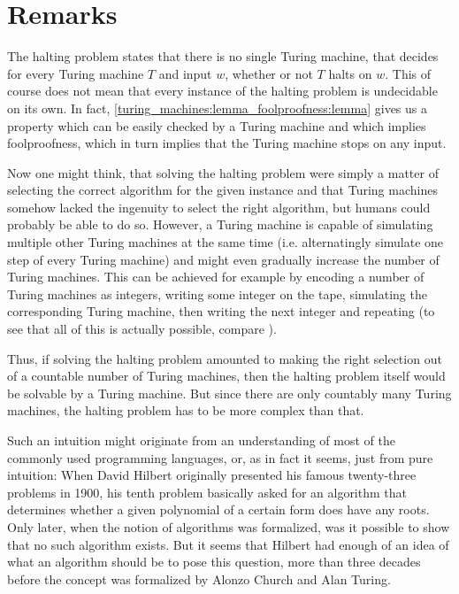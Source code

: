 \section{Remarks}

\begin{Remark}
	The halting problem states that there is no single Turing machine, that decides for every Turing machine $T$ and input $w$, whether or not $T$ halts on $w$. This of course does not mean that every instance of the halting problem is undecidable on its own. In fact, \ref{turing_machines:lemma_foolproofness:lemma} gives us a property which can be easily checked by a Turing machine and which implies foolproofness, which in turn implies that the Turing machine stops on any input.

	Now one might think, that solving the halting problem were simply a matter of selecting the correct algorithm for the given instance and that Turing machines somehow lacked the ingenuity to select the right algorithm, but humans could probably be able to do so. However, a Turing machine is capable of simulating multiple other Turing machines at the same time (i.e. alternatingly simulate one step of every Turing machine) and might even gradually increase the number of Turing machines. This can be achieved for example by encoding a number of Turing machines as integers, writing some integer on the tape, simulating the corresponding Turing machine, then writing the next integer and repeating (to see that all of this is actually possible, compare \cite{sip06}).

	Thus, if solving the halting problem amounted to making the right selection out of a countable number of Turing machines, then the halting problem itself would be solvable by a Turing machine. But since there are only countably many Turing machines, the halting problem has to be more complex than that.
\end{Remark}

\begin{Remark}
	Such an intuition might originate from an understanding of most of the commonly used programming languages, or, as in fact it seems, just from pure intuition: When David Hilbert originally presented his famous twenty-three problems in 1900, his tenth problem basically asked for an algorithm that determines whether a given polynomial of a certain form does have any roots.
	Only later, when the notion of algorithms was formalized, was it possible to show that no such algorithm exists.
	But it seems that Hilbert had enough of an idea of what an algorithm should be to pose this question, more than three decades before the concept was formalized by Alonzo Church and Alan Turing.
\end{Remark}

